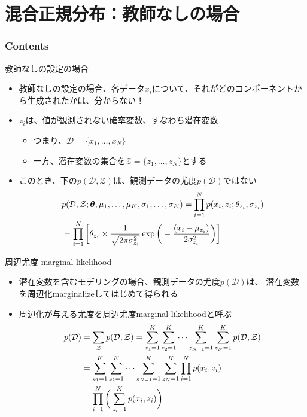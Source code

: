 \documentclass[aspectratio=169,unicode,dvipdfmx,14pt]{beamer}
\begin{document}
\section{混合正規分布：教師なしの場合}

\begin{frame}\frametitle{Contents}
\Large \tableofcontents[currentsection]
\end{frame}


\begin{frame}{教師なしの設定の場合}
\vspace{-.05in}
\begin{itemize}
\item 教師なしの設定の場合、各データ$x_i$について、それがどのコンポーネントから生成されたかは、分からない！
\item $z_i$は、値が観測されない確率変数、すなわち潜在変数
\begin{itemize}
\item つまり、$\mathcal{D} = \{ x_1, \ldots, x_N \}$
\item 一方、潜在変数の集合を$\mathcal{Z} = \{ z_1, \ldots, z_N \}$とする
\end{itemize}
\item このとき、下の$p(\mathcal{D}, \mathcal{Z})$は、観測データの尤度$p(\mathcal{D})$ではない
\vspace{-.13in}
\begin{align}
& p(\mathcal{D}, \mathcal{Z};\bm{\theta},\mu_1,\ldots,\mu_K,\sigma_1,\ldots,\sigma_K)
= \prod_{i=1}^N p(x_i, z_i ; \theta_{z_i}, \sigma_{z_i})
\notag \\ &
= \prod_{i=1}^N \bigg[ \theta_{z_i} \times \frac{1}{\sqrt{2\pi\sigma_{z_i}^2}}\exp\bigg( - \frac{(x_i - \mu_{z_i})}{2\sigma_{z_i}^2} \bigg) \bigg]
\end{align}
\end{itemize}
\end{frame}

\begin{frame}{周辺尤度 marginal likelihood}
\vspace{-.05in}
\begin{itemize}
\item 潜在変数を含むモデリングの場合、観測データの尤度$p(\mathcal{D})$は、
潜在変数を周辺化marginalizeしてはじめて得られる
\item 周辺化が与える尤度を周辺尤度marginal likelihoodと呼ぶ
\vspace{-.1in}
\begin{align}
p(\mathcal{D}) & = \sum_{\mathcal{Z}} p(\mathcal{D}, \mathcal{Z})
= \sum_{z_1=1}^K \sum_{z_2=1}^K \cdots \sum_{z_{N-1}=1}^K \sum_{z_N=1}^K p(\mathcal{D}, \mathcal{Z})
\notag \\ &
= \sum_{z_1=1}^K \sum_{z_2=1}^K \cdots \sum_{z_{N-1}=1}^K \sum_{z_N=1}^K \prod_{i=1}^N p(x_i, z_i)
\notag \\ &
= \prod_{i=1}^N \bigg( \sum_{z_i=1}^K p(x_i, z_i) \bigg)
\end{align}
\end{itemize}
\end{frame}
\end{document}
